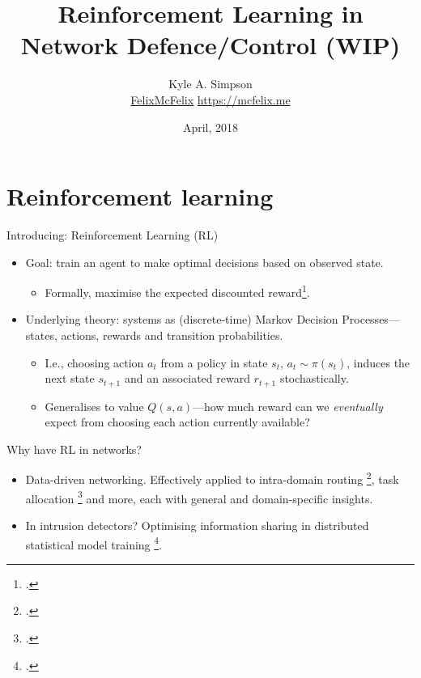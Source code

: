 \documentclass[aspectratio=169,xcolor={dvipsnames}
,hide notes
]{beamer}
\title{Reinforcement Learning in Network Defence/Control (WIP)}
\author{Kyle A. Simpson\\
	\small{\faGithub{} \href{https://github.com/felixmcfelix}{FelixMcFelix} \hspace{0.5em} \faGlobe{} \url{https://mcfelix.me}}}
\institute{University of Glasgow}
\date{\nth{10} April, 2018}
\begin{document}
\maketitle

\section{Reinforcement learning}

\begin{frame}{Introducing: Reinforcement Learning (RL)}
	\begin{itemize}
		\item Goal: train an agent to make optimal decisions based on observed state.
		\begin{itemize}
			\item Formally, maximise the \alert{expected discounted reward}\footcite{RL2E}.
		\end{itemize}
	
		\item Underlying theory: systems as (discrete-time) \alert{Markov Decision Processes}---states, actions, rewards and transition probabilities.
		\begin{itemize}
			\item I.e., choosing action $a_t$ from a policy in state $s_t$, $a_t \sim \pi(s_t)$, induces the next state $s_{t+1}$ and an associated reward $r_{t+1}$ stochastically.
			\item Generalises to \alert{value} $Q(s,a)$---how much reward can we \emph{eventually} expect from choosing each action currently available?
		\end{itemize}
	\end{itemize}
\end{frame}

\begin{frame}{Why have RL in networks?}
	
	\begin{itemize}
		\item \alert{Data-driven networking.} Effectively applied to intra-domain routing \footcite{DBLP:conf/hotnets/ValadarskySST17}, task allocation \footcite{DBLP:conf/hotnets/MaoAMK16} and more, each with general and domain-specific insights.
		
		\item \alert{In intrusion detectors?} Optimising information sharing in distributed statistical model training \footcite{DBLP:conf/paisi/XuSH07}.
	\end{itemize}
\end{frame}
\end{document}
